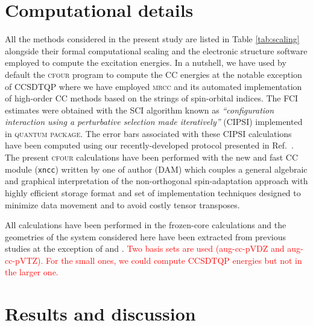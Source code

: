 \documentclass[aip,jcp,reprint,noshowkeys,superscriptaddress]{revtex4-1}
\newcommand{\titou}[1]{\textcolor{red}{#1}}
\newcommand{\QP}{\textsc{quantum package}}
\newcommand{\MRCC}{\textsc{mrcc}}
\newcommand{\CFOUR}{\textsc{cfour}}
\begin{document}
\section{Computational details}

All the methods considered in the present study are listed in Table \ref{tab:scaling} alongside their formal computational scaling and the electronic structure software employed to compute the excitation energies.
In a nutshell, we have used by default the {\CFOUR} program to compute the CC energies at the notable exception of CCSDTQP where we have employed {\MRCC} and its automated implementation of high-order CC methods based on the strings of spin-orbital indices.
The FCI estimates were obtained with the SCI algorithm known as \textit{``configuration interaction using a perturbative selection made iteratively''} (CIPSI) implemented in {\QP}.
The error bars associated with these CIPSI calculations have been computed using our recently-developed protocol presented in Ref.~.
The present {\CFOUR} calculations have been performed with the new and fast CC module (\texttt{xncc}) written by one of author (DAM) which couples a general algebraic
and graphical interpretation of the non-orthogonal spin-adaptation approach with highly efficient storage format and set of implementation techniques designed to minimize data movement and to avoid costly tensor transposes.

All calculations have been performed in the frozen-core calculations and the geometries of the system considered here have been extracted from previous studies at the exception of  and .
\titou{Two basis sets are used (aug-cc-pVDZ and aug-cc-pVTZ). 
For the small ones, we could compute CCSDTQP energies but not in the larger one.}

\section{Results and discussion}
\end{document}

